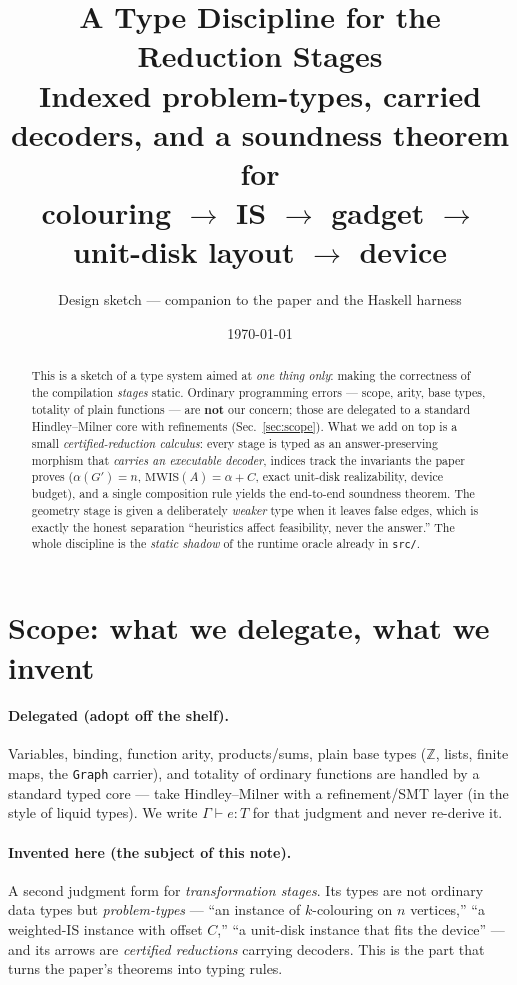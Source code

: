 \documentclass[11pt]{article}
\title{\textbf{A Type Discipline for the Reduction Stages}\\[0.35em]
  \large Indexed problem-types, carried decoders, and a soundness theorem for\\
  colouring $\to$ IS $\to$ gadget $\to$ unit-disk layout $\to$ device}
\author{Design sketch --- companion to the paper and the Haskell harness}
\date{\today}
\theoremstyle{definition}
\newcommand{\alphacol}{\alpha}
\begin{document}
\maketitle

\begin{abstract}
\noindent This is a sketch of a type system aimed at \emph{one thing only}: making
the correctness of the compilation \emph{stages} static. Ordinary programming
errors --- scope, arity, base types, totality of plain functions --- are
\textbf{not} our concern; those are delegated to a standard Hindley--Milner core
with refinements (Sec.~\ref{sec:scope}). What we add on top is a small
\emph{certified-reduction calculus}: every stage is typed as an answer-preserving
morphism that \emph{carries an executable decoder}, indices track the invariants
the paper proves ($\alphacol(G')=n$, $\mathrm{MWIS}(A)=\alphacol+C$, exact unit-disk
realizability, device budget), and a single composition rule yields the end-to-end
soundness theorem. The geometry stage is given a deliberately \emph{weaker} type
when it leaves false edges, which is exactly the honest separation ``heuristics
affect feasibility, never the answer.'' The whole discipline is the \emph{static
shadow} of the runtime oracle already in \texttt{src/}.
\end{abstract}

\tableofcontents

\section{Scope: what we delegate, what we invent}
\label{sec:scope}

\paragraph{Delegated (adopt off the shelf).} Variables, binding, function arity,
products/sums, plain base types ($\mathbb{Z}$, lists, finite maps, the
\texttt{Graph} carrier), and totality of ordinary functions are handled by a
standard typed core --- take Hindley--Milner with a refinement/SMT layer (in the
style of liquid types). We write $\Gamma \vdash e : T$ for that judgment and never
re-derive it.

\paragraph{Invented here (the subject of this note).} A second judgment form for
\emph{transformation stages}. Its types are not ordinary data types but
\emph{problem-types} --- ``an instance of $k$-colouring on $n$ vertices,'' ``a
weighted-IS instance with offset $C$,'' ``a unit-disk instance that fits the
device'' --- and its arrows are \emph{certified reductions} carrying decoders.
This is the part that turns the paper's theorems into typing rules.
\end{document}
